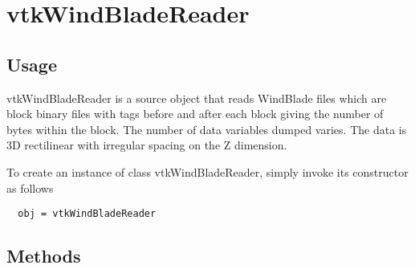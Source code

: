 \section{vtkWindBladeReader}

\subsection{Usage}

 vtkWindBladeReader is a source object that reads WindBlade files
 which are block binary files with tags before and after each block
 giving the number of bytes within the block.  The number of data 
 variables dumped varies.  The data is 3D rectilinear with irregular
 spacing on the Z dimension.


To create an instance of class vtkWindBladeReader, simply
invoke its constructor as follows
\begin{verbatim}
  obj = vtkWindBladeReader
\end{verbatim}
\subsection{Methods}

